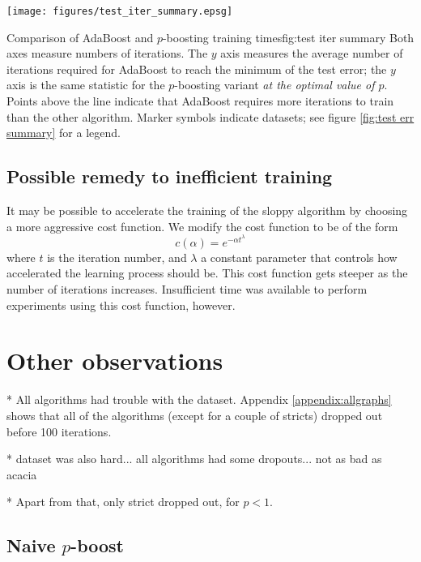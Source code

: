 \begin{linefigure}
\begin{center}
\texttt{[image: figures/test\_iter\_summary.epsg]}
\end{center}
\begin{capt}{Comparison of AdaBoost and $p$-boosting training
times}{fig:test iter summary} 
Both axes measure numbers of iterations.  The $y$ axis measures the
average number of iterations required for AdaBoost to reach the
minimum of the test error; the $y$ axis is the same statistic for the
$p$-boosting variant \emph{at the optimal value of $p$}.  Points above
the line indicate that AdaBoost requires more iterations to train than
the other algorithm.  Marker symbols indicate datasets; see figure
\ref{fig:test err summary} for a legend.
\end{capt}
\end{linefigure}

\subsection{Possible remedy to inefficient training}

It may be possible to accelerate the training of the sloppy algorithm
by choosing a more aggressive cost function.  We modify the cost
function to be of the form
%
\begin{equation}
c(\alpha) = e^{-\alpha t^\lambda}
\end{equation}
%
where $t$ is the iteration number, and $\lambda$ a constant parameter
that controls how accelerated the learning process should be.  This
cost function gets steeper as the number of iterations increases.
Insufficient time was available to perform experiments using this cost
function, however.




\section{Other observations}

* All algorithms had trouble with the  dataset.  Appendix
  \ref{appendix:allgraphs} shows that all of the algorithms (except
  for a couple of stricts) dropped out before 100 iterations.

*  dataset was also hard... all algorithms had some
  dropouts... not as bad as acacia

* Apart from that, only strict dropped out, for $p < 1$.

\subsection{Naive $p$-boost}

